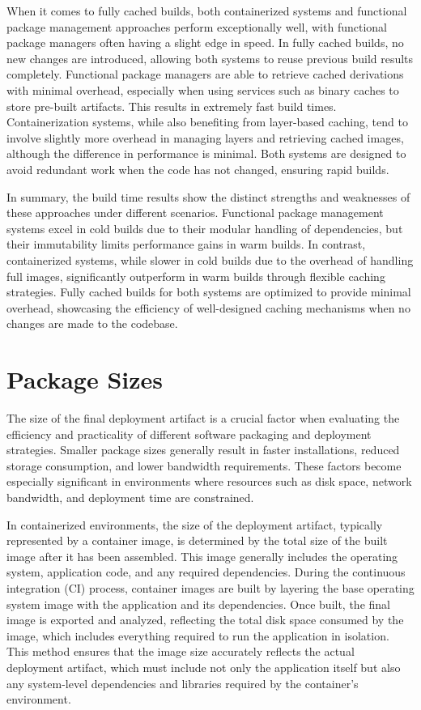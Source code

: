 When it comes to fully cached builds, both containerized systems and functional package
management approaches perform exceptionally well, with functional package managers often
having a slight edge in speed. In fully cached builds, no new changes are introduced,
allowing both systems to reuse previous build results completely. Functional package
managers are able to retrieve cached derivations with minimal overhead, especially when
using services such as binary caches to store pre-built artifacts. This results in extremely
fast build times. Containerization systems, while also benefiting from layer-based caching,
tend to involve slightly more overhead in managing layers and retrieving cached images,
although the difference in performance is minimal. Both systems are designed to avoid
redundant work when the code has not changed, ensuring rapid builds.

In summary, the build time results show the distinct strengths and weaknesses of these
approaches under different scenarios. Functional package management systems excel in cold
builds due to their modular handling of dependencies, but their immutability limits
performance gains in warm builds. In contrast, containerized systems, while slower in cold
builds due to the overhead of handling full images, significantly outperform in warm builds
through flexible caching strategies. Fully cached builds for both systems are optimized to
provide minimal overhead, showcasing the efficiency of well-designed caching mechanisms when
no changes are made to the codebase.

\section{Package Sizes}
The size of the final deployment artifact is a crucial factor when evaluating the efficiency
and practicality of different software packaging and deployment strategies. Smaller package
sizes generally result in faster installations, reduced storage consumption, and lower
bandwidth requirements. These factors become especially significant in environments where
resources such as disk space, network bandwidth, and deployment time are constrained.

In containerized environments, the size of the deployment artifact, typically represented by
a container image, is determined by the total size of the built image after it has been
assembled. This image generally includes the operating system, application code, and any
required dependencies. During the continuous integration (CI) process, container images are
built by layering the base operating system image with the application and its dependencies.
Once built, the final image is exported and analyzed, reflecting the total disk space
consumed by the image, which includes everything required to run the application in isolation.
This method ensures that the image size accurately reflects the actual deployment artifact,
which must include not only the application itself but also any system-level dependencies
and libraries required by the container's environment.

